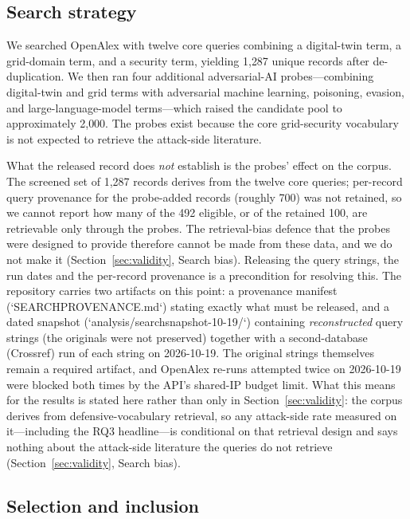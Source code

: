 \documentclass[preprint,12pt]{elsarticle}
\renewcommand{\_}{\plainunderscore\allowbreak}
\begin{document}
\subsection{Search strategy}

We searched OpenAlex with twelve core queries combining a digital-twin term, a grid-domain term,
and a security term, yielding 1{,}287 unique records after de-duplication. We then ran four
additional adversarial-AI probes---combining digital-twin and grid terms with adversarial
machine learning, poisoning, evasion, and large-language-model terms---which raised the
candidate pool to approximately 2{,}000. The probes exist because the core grid-security
vocabulary is not expected to retrieve the attack-side literature.

What the released record does \emph{not} establish is the probes' effect on the corpus. The
screened set of 1{,}287 records derives from the twelve core queries; per-record query
provenance for the probe-added records (roughly 700) was not retained, so we cannot report
how many of the 492 eligible, or of the retained 100, are retrievable only through the
probes. The retrieval-bias defence that the probes were designed to provide therefore
cannot be made from these data, and we do not make it (Section~\ref{sec:validity}, Search
bias). Releasing the query strings, the run dates and the per-record provenance is a
precondition for resolving this. The repository carries two artifacts on this point: a provenance
manifest (`SEARCH\_PROVENANCE.md`) stating exactly what must be released, and a dated
snapshot (`analysis/search\_snapshot\_2026-10-19/`) containing \emph{reconstructed}
query strings (the originals were not preserved) together with a second-database
(Crossref) run of each string on 2026-10-19. The original strings themselves remain a
required artifact, and OpenAlex re-runs attempted twice on 2026-10-19 were blocked both
times by the API's shared-IP budget limit. What
this means for the results is stated here rather than only in
Section~\ref{sec:validity}: the corpus derives from defensive-vocabulary retrieval, so
any attack-side rate measured on it---including the RQ3 headline---is conditional on
that retrieval design and says nothing about the attack-side literature the queries do
not retrieve (Section~\ref{sec:validity}, Search bias).

\subsection{Selection and inclusion}
\end{document}
